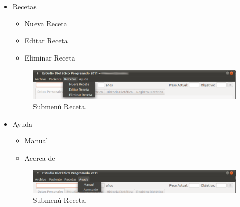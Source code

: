 \begin{itemize}
\item Recetas
\begin{itemize}
\item Nueva Receta
\item Editar Receta
\item Eliminar Receta
\end{itemize}

\begin{figure}[H]
  \label{receta}
  \begin{center}
    \includegraphics[scale=0.5]{../../Image/receta-barra.png}
  \end{center}
  \caption{Submenú Receta.}
\end{figure}

\item Ayuda
\begin{itemize}
\item Manual
\item Acerca de
\end{itemize}

\begin{figure}[H]
  \label{ayuda}
  \begin{center}
    \includegraphics[scale=0.5]{../../Image/ayuda-barra.png} 
  \end{center}
  \caption{Submenú Receta.}
\end{figure}

\end{itemize}

